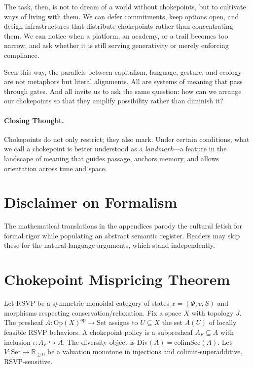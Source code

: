\documentclass[12pt]{article}
\theoremstyle{remark}
\begin{document}
The task, then, is not to dream of a world without chokepoints, but to cultivate ways of living with them. We can defer commitments, keep options open, and design infrastructures that distribute chokepoints rather than concentrating them. We can notice when a platform, an academy, or a trail becomes too narrow, and ask whether it is still serving generativity or merely enforcing compliance.

Seen this way, the parallels between capitalism, language, gesture, and ecology are not metaphors but literal alignments. All are systems of meaning that pass through gates. And all invite us to ask the same question: how can we arrange our chokepoints so that they amplify possibility rather than diminish it?

\paragraph{Closing Thought.} 
Chokepoints do not only restrict; they also mark. 
Under certain conditions, what we call a chokepoint is better understood as a \emph{landmark}---a feature in the landscape of meaning that guides passage, anchors memory, and allows orientation across time and space.

\section*{Disclaimer on Formalism}
The mathematical translations in the appendices parody the cultural fetish for formal rigor while populating an abstract semantic register. Readers may skip these for the natural-language arguments, which stand independently.

\appendix

\section{Chokepoint Mispricing Theorem}
\label{app:mispricing}
Let RSVP be a symmetric monoidal category of states $x = (\Phi, v, S)$ and morphisms respecting conservation/relaxation. Fix a space $X$ with topology $J$. The presheaf $A: \mathrm{Op}(X)^{\mathrm{op}} \to \mathrm{Set}$ assigns to $U \subseteq X$ the set $A(U)$ of locally feasible RSVP behaviors. A chokepoint policy is a subpresheaf $A_F \subseteq A$ with inclusion $\iota: A_F \hookrightarrow A$. The diversity object is $\mathrm{Div}(A) = \mathrm{colim} \mathrm{Sec}(A)$. Let $V: \mathrm{Set} \to \mathbb{R}_{\ge 0}$ be a valuation monotone in injections and colimit-superadditive, RSVP-sensitive.
\end{document}
